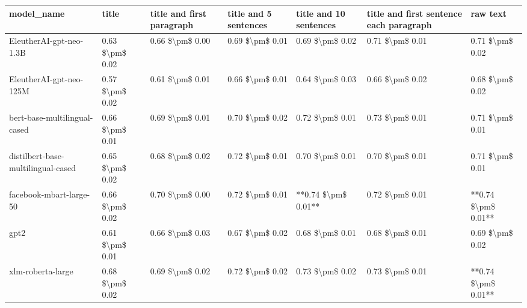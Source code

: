 \begin{tabular}{lllllll}
\toprule
                        model\_name &           title & title and first paragraph & title and 5 sentences & title and 10 sentences & title and first sentence each paragraph &            raw text \\
\midrule
           EleutherAI-gpt-neo-1.3B & 0.63 \$\textbackslash pm\$ 0.02 &           0.66 \$\textbackslash pm\$ 0.00 &       0.69 \$\textbackslash pm\$ 0.01 &        0.69 \$\textbackslash pm\$ 0.02 &                         0.71 \$\textbackslash pm\$ 0.01 &     0.71 \$\textbackslash pm\$ 0.02 \\
           EleutherAI-gpt-neo-125M & 0.57 \$\textbackslash pm\$ 0.02 &           0.61 \$\textbackslash pm\$ 0.01 &       0.66 \$\textbackslash pm\$ 0.01 &        0.64 \$\textbackslash pm\$ 0.03 &                         0.66 \$\textbackslash pm\$ 0.02 &     0.68 \$\textbackslash pm\$ 0.02 \\
      bert-base-multilingual-cased & 0.66 \$\textbackslash pm\$ 0.01 &           0.69 \$\textbackslash pm\$ 0.01 &       0.70 \$\textbackslash pm\$ 0.02 &        0.72 \$\textbackslash pm\$ 0.01 &                         0.73 \$\textbackslash pm\$ 0.01 &     0.71 \$\textbackslash pm\$ 0.01 \\
distilbert-base-multilingual-cased & 0.65 \$\textbackslash pm\$ 0.02 &           0.68 \$\textbackslash pm\$ 0.02 &       0.72 \$\textbackslash pm\$ 0.01 &        0.70 \$\textbackslash pm\$ 0.01 &                         0.70 \$\textbackslash pm\$ 0.01 &     0.71 \$\textbackslash pm\$ 0.01 \\
           facebook-mbart-large-50 & 0.66 \$\textbackslash pm\$ 0.02 &           0.70 \$\textbackslash pm\$ 0.00 &       0.72 \$\textbackslash pm\$ 0.01 &    **0.74 \$\textbackslash pm\$ 0.01** &                         0.72 \$\textbackslash pm\$ 0.01 & **0.74 \$\textbackslash pm\$ 0.01** \\
                              gpt2 & 0.61 \$\textbackslash pm\$ 0.01 &           0.66 \$\textbackslash pm\$ 0.03 &       0.67 \$\textbackslash pm\$ 0.02 &        0.68 \$\textbackslash pm\$ 0.01 &                         0.68 \$\textbackslash pm\$ 0.01 &     0.69 \$\textbackslash pm\$ 0.02 \\
                 xlm-roberta-large & 0.68 \$\textbackslash pm\$ 0.02 &           0.69 \$\textbackslash pm\$ 0.02 &       0.72 \$\textbackslash pm\$ 0.02 &        0.73 \$\textbackslash pm\$ 0.02 &                         0.73 \$\textbackslash pm\$ 0.01 & **0.74 \$\textbackslash pm\$ 0.01** \\
\bottomrule
\end{tabular}
